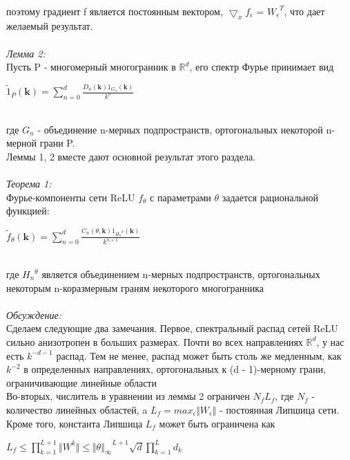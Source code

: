 \documentclass{article}
\begin{document}
    \\
    поэтому градиент f является постоянным вектором, $\bigtriangledown_{x}f_{\epsilon}$ = ${W_{\epsilon}}^{T}$, что дает желаемый результат.
    \\ \\
    \textit{Лемма 2:}
    \\
    Пусть P - многомерный многогранник в ${\mathbb{R}}^d$, его спектр Фурье принимает вид
    \begin{center}
    $\tilde{1}_{P}(\textbf{k}) = \sum\limits_{n=0}^{d}{\frac{D_n(\textbf{k})1_{G_{n}}(\textbf{k})}{k^n}}$ 
    \end{center}
    \\
    где $G_{n}$ - объединение n-мерных подпространств, ортогональных некоторой n-мерной грани P. 
    \\
    Леммы 1, 2 вместе дают основной результат этого раздела.
    \\ \\
    \textit{Теорема 1:}
    \\
    Фурье-компоненты сети ReLU $f_{\theta}$ с параметрами $\theta$ задается рациональной функцией:
    \begin{center}
    $\tilde{f}_{\theta}(\textbf{k}) = \sum\limits_{n=0}^{d}{\frac{C_n(\theta, \textbf{k})1_{{H_{n}}^{\theta}}(\textbf{k})}{k^{n+1}}}$ 
    \end{center}
    \\
    где ${{H_{n}}^{\theta}}$ является объединением n-мерных подпространств, ортогональных некоторым n-коразмерным граням некоторого многогранника
    \\ \\
    \textit{Обсуждение:}
    \\
    Сделаем следующие два замечания. Первое, спектральный распад сетей ReLU сильно анизотропен в больших размерах. Почти во всех направлениях ${\mathbb{R}}^d$, у нас есть $k^{−d − 1}$ распад. Тем не менее, распад может быть столь же медленным, как $k^{−2}$ в определенных направлениях, ортогональных к (d - 1)-мерному грани, ограничивающие линейные области
    \\
    Во-вторых, числитель в уравнении из леммы 2 ограничен $N_fL_f$, где $N_f$ - количество линейных областей, a $L_f = max_{\epsilon}\Vert W_{\epsilon} \Vert$ - постоянная Липшица сети.
    \\
    Кроме того, константа Липшица $L_f$ может быть ограничена как
    \begin{center}
    $L_f \leq \prod\limits_{k=1}^{L+1} \Vert W^{k} \Vert \leq {{\Vert \theta \Vert}_{\infty}}^{L+1} \surd{d} \prod\limits_{k=1}^{L}d_{k}$ 
    \end{center}
\end{document}

